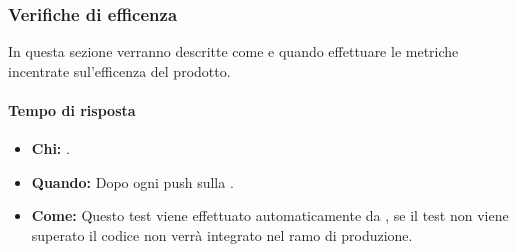 \newpage
\subsubsection{Verifiche di efficenza}
In questa sezione verranno descritte come e quando effettuare le metriche incentrate sul'efficenza del prodotto.

\paragraph{Tempo di risposta}
\begin{itemize}
\item \textbf{Chi:} .
\item \textbf{Quando:} Dopo ogni push sulla .
\item \textbf{Come:} Questo test viene effettuato automaticamente da , se il test non viene superato il codice non verrà integrato nel ramo di produzione.
\end{itemize}
